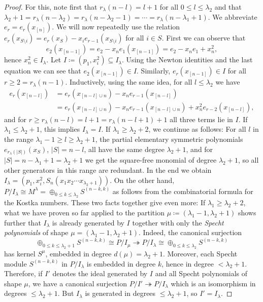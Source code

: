 \documentclass[11pt]{amsart}
\theoremstyle{definition}
\begin{document}
\begin{proof}
	For this, note first that $r_\lambda(n-l) = l+1$ for all $0 \leq l \leq \lambda_2$ and that $\lambda_2 + 1 = r_\lambda(n-\lambda_2) = r_\lambda(n-\lambda_2 - 1) = \cdots = r_\lambda(n-\lambda_1 + 1)$. We abbreviate $e_r = e_r(x_{[n]})$. We will now repeatedly use the relation $e_r(x_{S \setminus i}) = e_r(x_S) - x_i e_{r-1}(x_{S \setminus i})$ for all $i \in S$. First we can observe that
	\begin{equation*}
		e_2(x_{[n-1]}) = e_2 - x_n e_1(x_{[n-1]}) = e_2 - x_n e_1 + x_n^2,
	\end{equation*}
	hence $x_n^2 \in I_\lambda$. Let $I \coloneqq (p_1,x_i^2) \subseteq I_\lambda$. Using the Newton identities and the last equation we can see that $e_2(x_{[n-1]}) \in I$. Similarly, $e_r(x_{[n-1]}) \in I$ for all $r \geq 2 = r_\lambda(n-1)$. Inductively, using the same idea, for all $l \leq \lambda_2$ we have
	\begin{align*}
		e_r(x_{[n-l]}) &= e_r(x_{[n-l]\cup n}) - x_n e_{r-1}(x_{[n-l]}) \\ &= e_r(x_{[n-l]\cup n}) - x_n e_{r-1}(x_{[n-l]\cup n}) + x_n^2 e_{r-2}(x_{[n-l]}),
	\end{align*}
	and for $r \geq r_\lambda(n-l) = l+1 = r_\lambda(n-l+1) + 1$ all three terms lie in $I$. If $\lambda_1 \leq \lambda_2 + 1$, this implies $I_\lambda = I$. If $\lambda_1 \geq \lambda_2 + 2$, we continue as follows: For all $l$ in the range $\lambda_1 - 1 \geq l \geq \lambda_2 + 1$, the partial elementary symmetric polynomials $e_{r_\lambda(|S|)}(x_S)$, $|S| = n-l$, all have the same degree $\lambda_2 + 1$, and for $|S| = n-\lambda_1+1 = \lambda_2 + 1$ we get the square-free monomial of degree $\lambda_2 + 1$, so all other generators in this range are redundant. In the end we obtain $I_\lambda = (p_1,x_i^2, S_n(x_1 x_2 \cdots x_{\lambda_2+1}))$. On the other hand, $P/I_\lambda \cong M^\lambda = \oplus_{0 \leq k \leq \lambda_2} S^{(n-k,k)}$ as follows from the combinatorial formula for the Kostka numbers. These two facts together give even more: If $\lambda_1 \geq \lambda_2 + 2$, what we have proven so far applied to the partition $\mu \coloneqq (\lambda_1 - 1, \lambda_2 + 1)$ shows further that $I_\lambda$ is already generated by $I$ together with only the \emph{Specht polynomials} of shape $\mu = (\lambda_1 - 1,\lambda_2 + 1)$. Indeed, the canonical surjection
	\begin{equation*}
		\oplus_{0 \leq k \leq \lambda_2+1} S^{(n-k,k)} \cong P/I_\mu \twoheadrightarrow P/I_\lambda \cong \oplus_{0 \leq k \leq \lambda_2} S^{(n-k,k)}
	\end{equation*}
	has kernel $S^\mu$, embedded in degree $d(\mu) = \lambda_2 + 1$. Moreover, each Specht module $S^{(n-k,k)}$ in $P/I_\lambda$ is embedded in degree $k$, hence in degree $< \lambda_2 + 1$. Therefore, if $I'$ denotes the ideal generated by $I$ and all Specht polynomials of shape $\mu$, we have a canonical surjection $P/I' \twoheadrightarrow P/I_\lambda$ which is an isomorphism in degrees $\leq \lambda_2 + 1$. But $I_\lambda$ is generated in degrees $\leq \lambda_2 + 1$, so $I' = I_\lambda$.
		

\end{proof}
\end{document}
